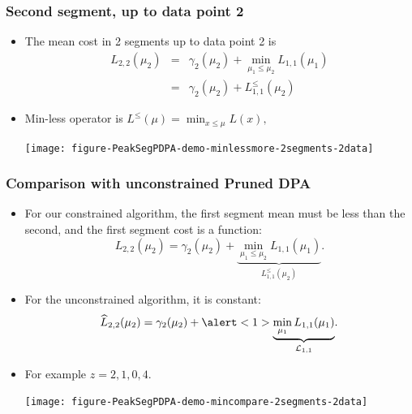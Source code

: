 \documentclass{beamer}
\begin{document}
\begin{frame}[fragile]
  \frametitle{Second segment, up to data point 2}
  \begin{itemize}
  \item The mean cost in 2 segments up to data point 2 is
\begin{eqnarray*}
  L_{2,2}(\mu_2) 
  &=&  \gamma_2(\mu_2)+\min_{\mu_1 \leq \mu_2} L_{1,1}(\mu_1)\\
  &=& \gamma_2(\mu_2)+L_{1,1}^{\leq}(\mu_2)
\end{eqnarray*}
\item Min-less operator is $L^\leq(\mu) = \min_{x\leq\mu} L(x),$
    \begin{center}
      \texttt{[image: figure-PeakSegPDPA-demo-minlessmore-2segments-2data]}
    \end{center}
\end{itemize}
\end{frame}

\begin{frame}
  \frametitle{Comparison with unconstrained Pruned DPA}
  \begin{itemize}
  \item For our constrained algorithm, the first segment mean must be
    less than the second, and the first segment cost is a function:
    \begin{equation*}
      L_{2,2}(\mu_2) = \gamma_2(\mu_2)+
      \underbrace{\min_{\mu_1 \leq \mu_2} L_{1,1}(\mu_1)}_{L^\leq_{1,1}(\mu_2)}.
    \end{equation*}
  \item For the unconstrained algorithm, it is \alert<1>{constant}:
    \begin{equation*}
      \widehat{L}_{2,2}(\mu_2) = \gamma_2(\mu_2)+
      \alert<1>{\underbrace{\min_{\mu_1} L_{1,1}(\mu_1)}_{\mathcal L_{1,1}}}.
    \end{equation*}
  \item For example $z = 2, 1, 0, 4$.
    \begin{center}
      \texttt{[image: figure-PeakSegPDPA-demo-mincompare-2segments-2data]}
    \end{center}
  \end{itemize}
\end{frame}
\end{document}
